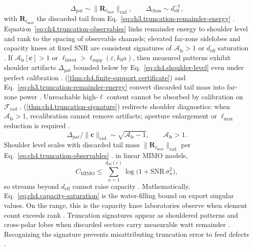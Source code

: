 \begin{equation}
\label{eq:ch4.truncation-observables}
\Delta_{\mathrm{pat}}
\sim
\|\mathbf{R}_{\ell_{\max}}\|_{\mathrm{rad}},
\qquad
\Delta_{\mathrm{chan}}
\sim
d_{\mathrm{eff}}^{-1},
\end{equation}
with \(\mathbf{R}_{\ell_{\max}}\) the discarded tail from Eq.~\eqref{eq:ch3.truncation-remainder-energy} \cite{hansen1988}.
Equation~\eqref{eq:ch4.truncation-observables} links remainder energy to shoulder level and rank to the spacing of observable channels; elevated
far-zone sidelobes and capacity knees at fixed SNR are consistent signatures of \(\mathcal{A}_{\mathrm{fs}}>1\) or \(d_{\mathrm{eff}}\) saturation
\cite{devaney2004}.
\label{thm:ch4.truncation-signature}
If \(\mathcal{A}_{\mathrm{fs}}[\mathbf{c}]>1\) or \(\ell_{\mathrm{listed}}>\ell_{\mathrm{supp}}(\varepsilon,k_{0}a)\), then measured patterns exhibit
shoulder artifacts \(\Delta_{\mathrm{pat}}\) bounded below by Eq.~\eqref{eq:ch4.shoulder-level} even under perfect calibration \cite{hansen1988}.
(\ref{thm:ch4.finite-support certificate}) and Eq.~\eqref{eq:ch3.truncation-remainder-energy} convert discarded tail mass into far-zone power
\cite{hansen1988}. Unreachable high-\(\ell\) content cannot be absorbed by calibration on \(\mathcal{F}_{\mathrm{rad}}\) \cite{harrington2001}.
(\ref{thm:ch4.truncation-signature}) redirects shoulder diagnostics: when \(\mathcal{A}_{\mathrm{fs}}>1\), recalibration cannot remove artifacts;
aperture enlargement or \(\ell_{\max}\) reduction is required \cite{stratton1941}.
\begin{equation}
\label{eq:ch4.shoulder-level}
\Delta_{\mathrm{pat}}/\|\mathbf{c}\|_{\mathrm{rad}}\sim\sqrt{\mathcal{A}_{\mathrm{fs}}-1},\qquad
\mathcal{A}_{\mathrm{fs}}>1.
\end{equation}
Shoulder level scales with discarded tail mass \(\|\mathbf{R}_{\ell_{\max}}\|_{\mathrm{rad}}\) per Eq.~\eqref{eq:ch4.truncation-observables}
\cite{hansen1988}.
in linear MIMO models,
\begin{equation}
\label{eq:ch4.capacity-saturation}
C_{\mathrm{MIMO}}\le\sum_{n=1}^{d_{\mathrm{eff}}(\varepsilon)}\log\bigl(1+\mathrm{SNR}\,\sigma_{n}^{2}\bigr),
\end{equation}
so streams beyond \(d_{\mathrm{eff}}\) cannot raise capacity \cite{harrington2001}. Mathematically,
Eq.~\eqref{eq:ch4.capacity-saturation} is the water-filling bound on export singular values. On the range, this is the capacity knee laboratories observe
when element count exceeds rank \cite{stratton1941}.
Truncation signatures appear as shouldered patterns and cross-polar lobes when discarded sectors carry measurable watt remainder \cite{harrington2001}. Recognizing the signature prevents misattributing truncation error to feed defects \cite{devaney2004}.
